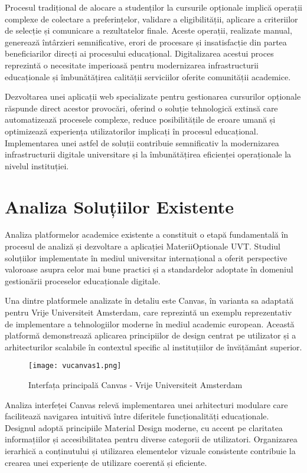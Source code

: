\documentclass[12pt,a4paper]{report}
\begin{document}
Procesul tradițional de alocare a studenților la cursurile opționale implică operații complexe de colectare a preferințelor, validare a eligibilității, aplicare a criteriilor de selecție și comunicare a rezultatelor finale. Aceste operații, realizate manual, generează întârzieri semnificative, erori de procesare și insatisfacție din partea beneficiarilor direcți ai procesului educațional. Digitalizarea acestui proces reprezintă o necesitate imperioasă pentru modernizarea infrastructurii educaționale și îmbunătățirea calității serviciilor oferite comunității academice.

Dezvoltarea unei aplicații web specializate pentru gestionarea cursurilor opționale răspunde direct acestor provocări, oferind o soluție tehnologică extinsă care automatizează procesele complexe, reduce posibilitățile de eroare umană și optimizează experiența utilizatorilor implicați în procesul educațional. Implementarea unei astfel de soluții contribuie semnificativ la modernizarea infrastructurii digitale universitare și la îmbunătățirea eficienței operaționale la nivelul instituției.

\section{Analiza Soluțiilor Existente}

Analiza platformelor academice existente a constituit o etapă fundamentală în procesul de analiză și dezvoltare a aplicației MateriiOptionale UVT. Studiul soluțiilor implementate în mediul universitar internațional a oferit perspective valoroase asupra celor mai bune practici și a standardelor adoptate în domeniul gestionării proceselor educaționale digitale.

Una dintre platformele analizate în detaliu este Canvas, în varianta sa adaptată pentru Vrije Universiteit Amsterdam, care reprezintă un exemplu reprezentativ de implementare a tehnologiilor moderne în mediul academic european. Această platformă demonstrează aplicarea principiilor de design centrat pe utilizator și a arhitecturilor scalabile în contextul specific al instituțiilor de învățământ superior.

\begin{figure}[H]
\centering
\texttt{[image: vucanvas1.png]}
\caption{Interfața principală Canvas - Vrije Universiteit Amsterdam}
\label{fig:canvas1}
\end{figure}

Analiza interfeței Canvas relevă implementarea unei arhitecturi modulare care facilitează navigarea intuitivă între diferitele funcționalități educaționale. Designul adoptă principiile Material Design moderne, cu accent pe claritatea informațiilor și accesibilitatea pentru diverse categorii de utilizatori. Organizarea ierarhică a conținutului și utilizarea elementelor vizuale consistente contribuie la crearea unei experiențe de utilizare coerentă și eficiente.
\end{document}
